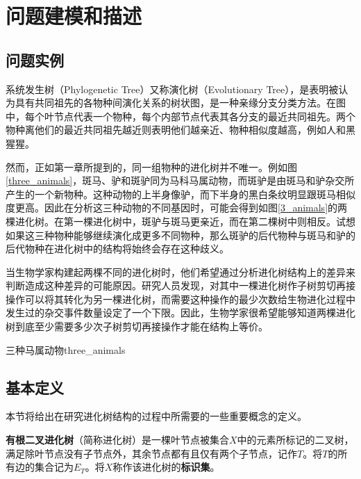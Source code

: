 
\chapter{问题建模和描述}

\section{问题实例}

系统发生树（Phylogenetic Tree）又称演化树（Evolutionary Tree），是表明被认为具有共同祖先的各物种间演化关系的树状图，是一种亲缘分支分类方法。在图中，每个叶节点代表一个物种，每个内部节点代表其各分支的最近共同祖先。两个物种离他们的最近共同祖先越近则表明他们越亲近、物种相似度越高，例如人和黑猩猩。
$ $\\

然而，正如第一章所提到的，同一组物种的进化树并不唯一。例如图\ref{three_animals}，斑马、驴和斑驴同为马科马属动物，而斑驴是由斑马和驴杂交所产生的一个新物种。这种动物的上半身像驴，而下半身的黑白条纹明显跟斑马相似度更高。因此在分析这三种动物的不同基因时，可能会得到如图\ref{3_animals}的两棵进化树。在第一棵进化树中，斑驴与斑马更亲近，而在第二棵树中则相反。试想如果这三种物种能够继续演化成更多不同物种，那么斑驴的后代物种与斑马和驴的后代物种在进化树中的结构将始终会存在这种歧义。

当生物学家构建起两棵不同的进化树时，他们希望通过分析进化树结构上的差异来判断造成这种差异的可能原因。研究人员发现，对其中一棵进化树作子树剪切再接操作可以将其转化为另一棵进化树，而需要这种操作的最少次数给生物进化过程中发生过的杂交事件数量设定了一个下限。因此，生物学家很希望能够知道两棵进化树到底至少需要多少次子树剪切再接操作才能在结构上等价。

\begin{pics}[htbp]{三种马属动物}{three_animals} 
\end{pics}


\section{基本定义}
本节将给出在研究进化树结构的过程中所需要的一些重要概念的定义。

\begin{dingyi}
\textbf{有根二叉进化树}（简称进化树）是一棵叶节点被集合$X$中的元素所标记的二叉树，满足除叶节点没有子节点外，其余节点都有且仅有两个子节点，记作$T$。将$T$的所有边的集合记为$E_T$。将\textbf{$X$}称作该进化树的\textbf{标识集}。
\end{dingyi}

